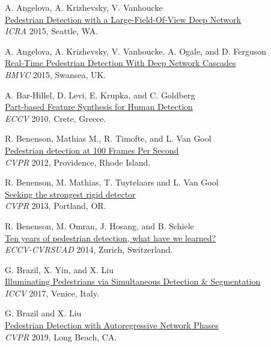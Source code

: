 \documentclass[onecolumn]{article}
\begin{document}
\begin{thebibliography}{1}%

A. Angelova, A. Krizhevsky, V. Vanhoucke\\
\href{http://www.vision.caltech.edu/anelia/publications/Angelova15LFOV.pdf}{
Pedestrian Detection with a Large-Field-Of-View Deep Network}\\
\textit{ICRA} 2015, Seattle, WA.

A. Angelova, A. Krizhevsky, V. Vanhoucke, A. Ogale, and D. Ferguson\\
\href{http://www.vision.caltech.edu/anelia/publications/Angelova15RealTimePedestrian.pdf}{
Real-Time Pedestrian Detection With Deep Network Cascades}\\
\textit{BMVC} 2015, Swansea, UK.

A. Bar-Hillel, D. Levi, E. Krupka, and C. Goldberg\\
\href{http://sites.google.com/site/aharonbarhillel}{
Part-based Feature Synthesis for Human Detection}\\
\textit{ECCV} 2010, Crete, Greece.

R. Benenson, Mathias M., R. Timofte, and L. Van Gool\\
\href{http://rodrigob.github.com}{
Pedestrian detection at 100 Frames Per Second}\\
\textit{CVPR} 2012,  Providence, Rhode Island.

R. Benenson, M. Mathias, T. Tuytelaars and L. Van Gool\\
\href{http://rodrigob.github.com}{
Seeking the strongest rigid detector}\\
\textit{CVPR} 2013, Portland, OR.

R. Benenson, M. Omran, J. Hosang, and B. Schiele\\
\href{http://rodrigob.github.com}{
Ten years of pedestrian detection, what have we learned?}\\
\textit{ECCV-CVRSUAD} 2014, Zurich, Switzerland.

G. Brazil, X. Yin, and X. Liu\\
\href{https://github.com/garrickbrazil/SDS-RCNN}{
Illuminating Pedestrians via Simultaneous Detection \& Segmentation}\\
\textit{ICCV} 2017, Venice, Italy.

G. Brazil and X. Liu\\
\href{http://cvlab.cse.msu.edu/project-arped.html}{Pedestrian Detection with Autoregressive Network Phases}\\
\textit{CVPR} 2019, Long Beach, CA.


\end{thebibliography}
\end{document}
